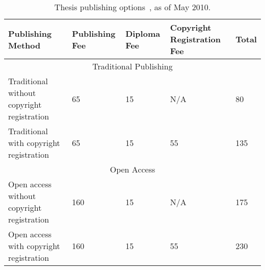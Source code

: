 \begin{table}[htbp]
\centering
\caption[Thesis Publishing Options]{Thesis publishing options~\cite{mudd2009}, as of May 2010. }
\label{table:pastwork:publishing}
\begin{tabular}{p{} p{} p{} p{} p{}}
\toprule
\textbf{Publishing Method} & \textbf{Publishing Fee}
 & \textbf{Diploma Fee} & \textbf{Copyright Registration Fee} & \textbf{Total} \\
\midrule
\multicolumn{5}{c}{Traditional Publishing}\\
\midrule

Traditional without copyright registration
& 65 & 15 & N/A & 80 \\[0.2em]

Traditional with copyright registration
& 65 & 15 & 55 & 135 \\[0.2em]

\midrule
\multicolumn{5}{c}{Open Access}\\
\midrule

Open access without copyright registration
& 160 & 15 & N/A & 175 \\[0.2em]

Open access with copyright registration
& 160 & 15 & 55 & 230 \\

\bottomrule
\end{tabular}
\end{table}

